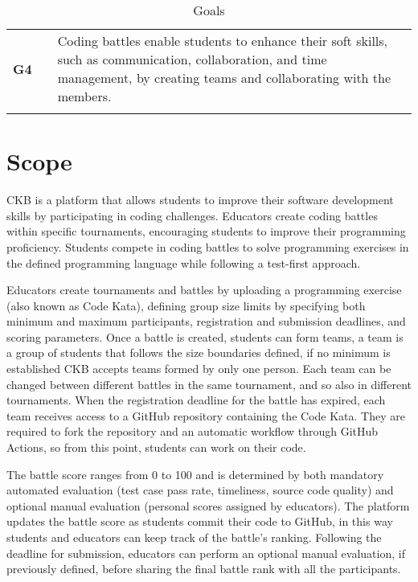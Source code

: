 \begin{table}[H]
\begin{tabular}{l l p{12.5cm}}
        \textbf{G4}  & \vline & Coding battles enable students to enhance their soft skills, such as communication, collaboration, and time management, by creating teams and collaborating with the members.       \\ 
                     &        &                                                                                                                                                                                     \\
        \hline
    \end{tabular}
    \caption{Goals}
\end{table}

\section{Scope}
CKB is a platform that allows students to improve their software development skills by participating in coding challenges.
Educators create coding battles within specific tournaments, encouraging students to improve their programming proficiency.
Students compete in coding battles to solve programming exercises in the defined programming language while following a test-first approach.

Educators create tournaments and battles by uploading a programming exercise (also known as Code Kata), defining group size limits by specifying both minimum and maximum participants, registration and submission deadlines, and scoring parameters.
Once a battle is created, students can form teams, a team is a group of students that follows the size boundaries defined, if no minimum is established CKB accepts teams formed by only one person.
Each team can be changed between different battles in the same tournament, and so also in different tournaments. 
When the registration deadline for the battle has expired, each team receives access to a GitHub repository containing the Code Kata.
They are required to fork the repository and an automatic workflow through GitHub Actions, so from this point, students can work on their code.

The battle score ranges from 0 to 100 and is determined by both mandatory automated evaluation (test case pass rate, timeliness, source code quality) and optional manual evaluation (personal scores assigned by educators).
The platform updates the battle score as students commit their code to GitHub, in this way students and educators can keep track of the battle's ranking.
Following the deadline for submission, educators can perform an optional manual evaluation, if previously defined, before sharing the final battle rank with all the participants.


